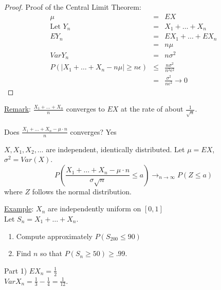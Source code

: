   \begin{proof}
    Proof of the Central Limit Theorem:\\
    \begin{eqnarray*}
      \mu & = & EX\\
      \text{Let } Y_n & = & X_1 + \ldots + X_n\\
      EY_n & = & EX_1 + \ldots + EX_n\\
      & = & n\mu \\
      Var Y_n & = & n \sigma^2\\
      P(|X_1 + \ldots + X_n - n\mu| \ge n\epsilon) 
      & \le & \frac{n\sigma^2}{n^2\epsilon^2}\\
      & = & \frac{\sigma^2}{n \epsilon^2} \to 0
    \end{eqnarray*}
  \end{proof}
  \underline{Remark}: $\frac{X_1 + \ldots + X_n}{n}$ converges to $EX$ at
  the rate of about $\frac{1}{\sqrt{n}}$.\\\\
  Does $\frac{X_1 + \ldots + X_n - \mu \cdot n}{n}$ converges? Yes\\
  \begin{theorem}
    $X, X_1, X_2, \ldots$ are independent, identically distributed. Let $\mu =
    EX$, $\sigma^2 = Var(X)$.\\
    $$
      P\left(\frac{X_1 + \ldots + X_n - \mu \cdot n}{\sigma\sqrt{n}} \le a
      \right) \to_{n \to \infty} P(Z \le a)
    $$
    where $Z$ follows the normal distribution.
  \end{theorem}
  \noindent\underline{Example}: $X_n$ are independently uniform on $[0,1]$\\
  Let $S_n = X_1 + \ldots + X_n$.
  \begin{enumerate}
    \item Compute approximately $P(S_{200} \le 90)$
    \item Find $n$ so that $P(S_n \ge 50) \ge .99$.
  \end{enumerate}
  Part 1) $EX_n = \frac{1}{2}$\\
  $Var X_n = \frac{1}{3} - \frac{1}{4} = \frac{1}{12}$.
